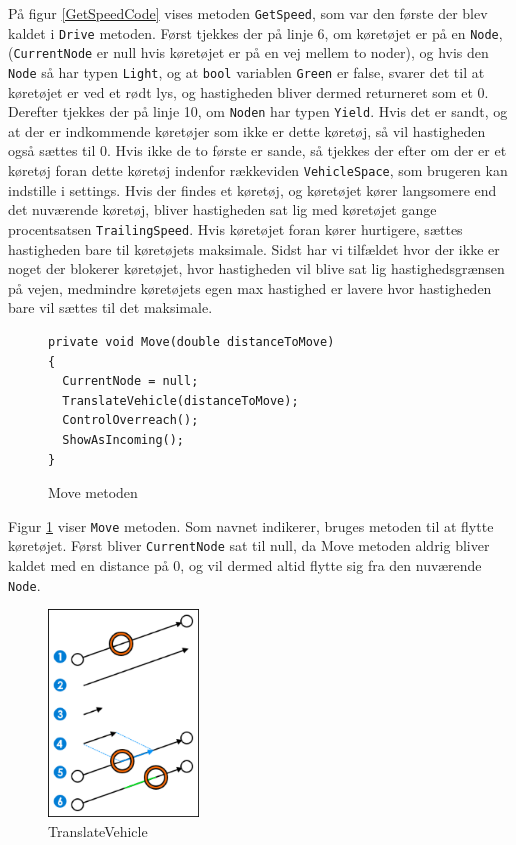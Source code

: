 På figur \ref{GetSpeedCode} vises metoden \texttt{GetSpeed}, som var den første der blev kaldet i \texttt{Drive} metoden. Først tjekkes der på linje 6, om køretøjet er på en \texttt{Node}, (\texttt{CurrentNode} er null hvis køretøjet er på en vej mellem to noder), og hvis den \texttt{Node} så har typen \texttt{Light}, og at \texttt{bool} variablen \texttt{Green} er false, svarer det til at køretøjet er ved et rødt lys, og hastigheden bliver dermed returneret som et 0. Derefter tjekkes der på linje 10, om \texttt{Noden} har typen \texttt{Yield}. Hvis det er sandt, og at der er indkommende køretøjer som ikke er dette køretøj, så vil hastigheden også sættes til 0. Hvis ikke de to første er sande, så tjekkes der efter om der er et køretøj foran dette køretøj indenfor rækkeviden \texttt{VehicleSpace}, som brugeren kan indstille i settings. Hvis der findes et køretøj, og køretøjet kører langsomere end det nuværende køretøj, bliver hastigheden sat lig med køretøjet gange procentsatsen \texttt{TrailingSpeed}. Hvis køretøjet foran kører hurtigere, sættes hastigheden bare til køretøjets maksimale. Sidst har vi tilfældet hvor der ikke er noget der blokerer køretøjet, hvor hastigheden vil blive sat lig hastighedsgrænsen på vejen, medmindre køretøjets egen max hastighed er lavere hvor hastigheden bare vil sættes til det maksimale.

\begin{figure}[H]
\begin{lstlisting}
private void Move(double distanceToMove)
{
  CurrentNode = null;
  TranslateVehicle(distanceToMove);
  ControlOverreach();
  ShowAsIncoming();
}
\end{lstlisting}
\caption{Move metoden}\label{MoveCode}
\end{figure}

Figur \ref{MoveCode} viser \texttt{Move} metoden. Som navnet indikerer, bruges metoden til at flytte køretøjet. Først bliver \texttt{CurrentNode} sat til null, da Move metoden aldrig bliver kaldet med en distance på 0, og vil dermed altid flytte sig fra den nuværende \texttt{Node}. 

\begin{figure}
    \centering
    \includegraphics[width=4cm,keepaspectratio]{Pictures/Implementation/TranslateVehicle}
    \caption{TranslateVehicle}
    \label{TranslateVehicle}
\end{figure}

